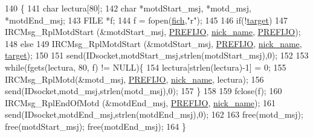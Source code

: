 \begin{DoxyCode}
140                                                                          \{
141         \textcolor{keywordtype}{char} lectura[80];
142         \textcolor{keywordtype}{char} *motdStart\_msj, *motd\_msj, *motdEnd\_msj;
143         FILE *f;
144         f = fopen(\hyperlink{_g-2361-06-_p1-_server_8c_a5666511ca3d4a3dc685c6f14c663aed5}{fich},\textcolor{stringliteral}{"r"});
145         
146         \textcolor{keywordflow}{if}(!\hyperlink{_g-2361-06-_p1-_server_8c_a23b26cdb3a71f525caf03b57f68d47fa}{target})
147                 IRCMsg\_RplMotdStart (&motdStart\_msj, \hyperlink{_g-2361-06-_p1-_server_8h_a78c658ff923693099f7b621e7c351129}{PREFIJO}, \hyperlink{_g-2361-06-_p1-_server_8c_aabbf66718cda228b924a4a9441eadf62}{nick\_name}, 
      \hyperlink{_g-2361-06-_p1-_server_8h_a78c658ff923693099f7b621e7c351129}{PREFIJO});
148         \textcolor{keywordflow}{else}
149                 IRCMsg\_RplMotdStart (&motdStart\_msj, \hyperlink{_g-2361-06-_p1-_server_8h_a78c658ff923693099f7b621e7c351129}{PREFIJO}, \hyperlink{_g-2361-06-_p1-_server_8c_aabbf66718cda228b924a4a9441eadf62}{nick\_name}, 
      \hyperlink{_g-2361-06-_p1-_server_8c_a23b26cdb3a71f525caf03b57f68d47fa}{target});
150 
151         send(IDsocket,motdStart\_msj,strlen(motdStart\_msj),0);
152         
153         \textcolor{keywordflow}{while}(fgets(lectura, 80, f) != NULL)\{
154                 lectura[strlen(lectura)-1] = 0;
155                 IRCMsg\_RplMotd(&motd\_msj, \hyperlink{_g-2361-06-_p1-_server_8h_a78c658ff923693099f7b621e7c351129}{PREFIJO}, \hyperlink{_g-2361-06-_p1-_server_8c_aabbf66718cda228b924a4a9441eadf62}{nick\_name}, lectura);
156                 send(IDsocket,motd\_msj,strlen(motd\_msj),0);             
157         \}
158 
159         fclose(f);
160         IRCMsg\_RplEndOfMotd (&motdEnd\_msj, \hyperlink{_g-2361-06-_p1-_server_8h_a78c658ff923693099f7b621e7c351129}{PREFIJO}, \hyperlink{_g-2361-06-_p1-_server_8c_aabbf66718cda228b924a4a9441eadf62}{nick\_name});
161         send(IDsocket,motdEnd\_msj,strlen(motdEnd\_msj),0);
162 
163         free(motd\_msj); free(motdStart\_msj); free(motdEnd\_msj);
164 \}
\end{DoxyCode}
